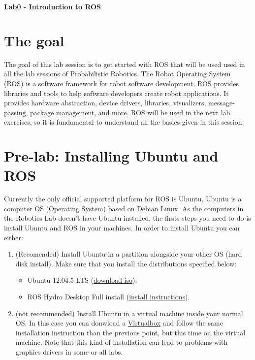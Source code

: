 \documentclass[a4paper,10pt]{article}
\begin{document}
\marginsize{2cm}{2cm}{2cm}{2cm}

\begin{center}
\Large \textbf{Lab0 - Introduction to ROS}
\end{center}

\section{The goal}

The goal of this lab session is to get started with ROS that will be used used in all the lab sessions of Probabilistic Robotics. The Robot Operating System (ROS) is a software framework for robot software development. ROS provides libraries and tools to help software developers create robot applications. It provides hardware abstraction, device drivers, libraries, visualizers, message-passing, package management, and more. ROS will be used in the next lab exercises, so it is fundamental to understand all the basics given in this session. 

\section{Pre-lab: Installing Ubuntu and ROS}

Currently the only official supported platform for ROS is Ubuntu. Ubuntu is a computer OS (Operating System) based on Debian Linux. As the computers in the Robotics Lab doesn't have Ubuntu installed, the firsts steps you need to do is install Ubuntu and ROS in your machines. In order to install Ubuntu you can either:

\begin{enumerate}
    \item (Recomended) Install Ubuntu in a partition alongside your other OS (hard disk install). Make sure that you install the distributions specified below:
    \begin{itemize}
        \item Ubuntu 12.04.5 LTS (\href{http://releases.ubuntu.com/12.04/ubuntu-12.04.5-desktop-amd64.iso}{download iso}).
        \item ROS Hydro Desktop Full install (\href{http://wiki.ros.org/hydro/Installation/Ubuntu}{install instructions}).
    \end{itemize}
    
    \item (not recommended) Install Ubuntu in a virtual machine inside your normal OS. In this case you can donwload a \href{https://www.virtualbox.org/wiki/Linux_Downloads}{Virtualbox}  and follow the same installation instruction than the previous point, but this time on the virtual machine. Note that this kind of installation can lead to problems with graphics drivers in some or all labs.
\end{enumerate}
\end{document}
